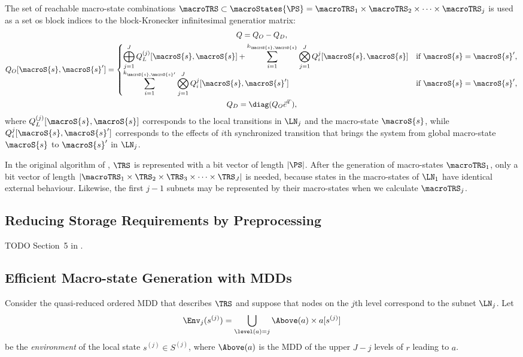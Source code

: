 The set of reachable macro-state combinations
$\macroTRS \subset \macroStates{\PS} = \macroTRS_1 \times \macroTRS_2
\times \cdots \times \macroTRS_j$
is used as a set os block indices to the block-Kronecker infinitesimal
generatior matrix:
\begin{gather}
  Q = Q_O - Q_D \text, \\
  Q_O[\macroS{s}, \macroS{s}'] = \begin{cases} \displaystyle
    \bigoplus_{j = 1}^J Q_L^{(j)}[\macroS{s}, \macroS{s}] + \sum_{i =
      1}^{k_{\macroS{s}, \macroS{s}}} \bigotimes_{j = 1}^J
    Q_{i}^{j}[\macroS{s},
    \macroS{s}] & \text{if $\macroS{s} = \macroS{s}'$,} \\
    \displaystyle \sum_{i = 1}^{k_{\macroS{s}, \macroS{s}'}}
    \bigotimes_{j = 1}^J Q_{i}^{j}[\macroS{s}, \macroS{s}'] & \text{if
      $\macroS{s} = \macroS{s}'$,}
  \end{cases} \\
  Q_D = \diag (Q_O \vec{e}^T) \text,
\end{gather}
where $Q_L^{(j)}[\macroS{s}, \macroS{s}]$ corresponds to the local
transitions in $\LN_j$ and the macro-state $\macroS{s}$, while
$Q_{i}^{j}[\macroS{s}, \macroS{s}']$ corresponds to the effects of
$i$th synchronized transition that brings the system from global
macro-state $\macroS{s}$ to $\macroS{s}'$ in $\LN_j$.

In the original algorithm of \citet{DBLP:journals/tse/Buchholz99},
$\TRS$ is represented with a bit vector of length $\lvert \PS
\rvert$.
After the generation of macro-states $\macroTRS_1$, only a bit vector
of length
$\lvert \macroTRS_1 \times \TRS_2 \times \TRS_3 \times \cdots \times
\TRS_J \rvert$
is needed, because states in the macro-states of $\LN_1$ have
identical external behaviour. Likewise, the first $j - 1$ subnets may
be represented by their macro-states when we calculate $\macroTRS_j$.

\subsection{Reducing Storage Requirements by Preprocessing}

TODO Section~5 in \citet{DBLP:journals/tse/Buchholz99}.

\subsection{Efficient Macro-state Generation with MDDs}

Consider the quasi-reduced ordered MDD that describes $\TRS$ and
suppose that nodes on the $j$th level correspond to the subnet
$\LN_j$. Let
\begin{equation}
  \Env_j(s^{(j)}) = \bigcup_{\level(a) = j} \Above(a) \times a[s^{(j)}]
\end{equation}
be the \emph{environment} of the local state $s^{(j)} \in S^{(j)}$,
where $\Above(a)$ is the MDD of the upper $J - j$ levels of $r$
leading to $a$.

